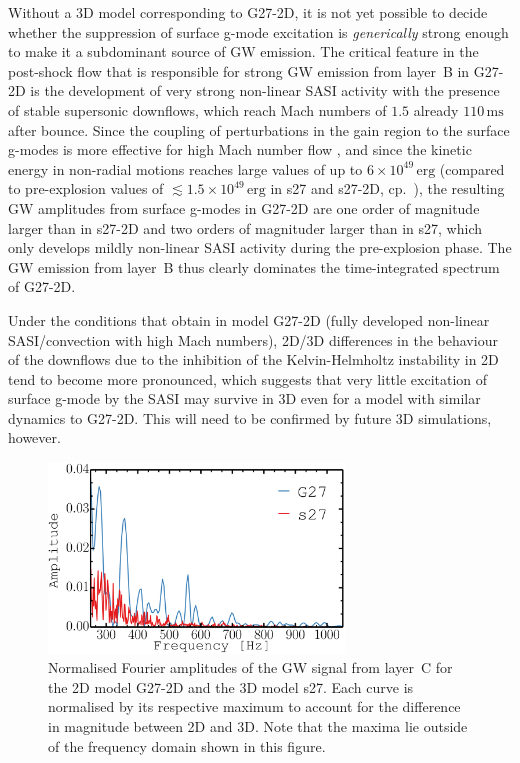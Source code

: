 Without a 3D model corresponding to G27-2D, it is not yet
possible to decide whether the suppression of surface g-mode
excitation is \emph{generically} strong enough to make it a
subdominant source of GW emission. The critical feature in the
post-shock flow that is responsible for strong GW emission from
layer~B in G27-2D is the development of very strong non-linear SASI
activity with the presence of stable supersonic downflows, which
reach Mach numbers of $1.5$ already $110 \, \mathrm{ms}$ after
bounce. Since the coupling of perturbations in the gain region to
the surface g-modes is more effective for high Mach number flow
\citep[cp.][]{goldreich_90,lecoanet_12}, and since the kinetic
energy in non-radial motions reaches large values of up to $6 \times
10^{49} \, \mathrm{erg}$ (compared to pre-explosion values of
$\mathord{\lesssim 1.5} \times 10^{49} \, \mathrm{erg}$ in s27
and s27-2D,
cp.\ \citealp{hanke_13}), the resulting GW amplitudes from surface
g-modes in G27-2D are one order of magnitude larger  than in s27-2D
and two orders of magnituder larger than in s27, which only
develops mildly non-linear SASI activity during the pre-explosion
phase. The GW emission from layer~B thus clearly dominates the
time-integrated spectrum of G27-2D.

Under the conditions that obtain in model G27-2D (fully
developed non-linear SASI/convection with high Mach numbers), 2D/3D
differences in the behaviour of the downflows due to the inhibition
of the Kelvin-Helmholtz instability in 2D tend to become more
pronounced, which suggests that very little excitation of surface
g-mode by the SASI may survive in 3D even for a model with similar
dynamics to G27-2D.  This will need to be confirmed by future 3D
simulations, however.

\begin{figure}
\centering
\includegraphics[width=0.7\textwidth]{./images/paper1/fig10.pdf}
\caption{Normalised Fourier amplitudes of the GW signal from layer~C
for the 2D model G27-2D and the 3D model s27. Each curve is normalised by its respective maximum to account for
the difference in magnitude between 2D and 3D. Note that the maxima lie outside of the frequency domain shown in this figure.
\label{fig:post3v2}}
\end{figure}

